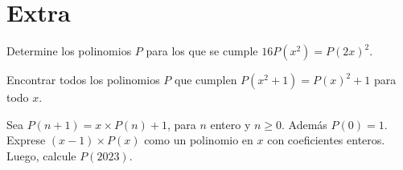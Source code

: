 \section{Extra}

\begin{section-problem}
    Determine los polinomios $P$ para los que se cumple $16P(x^2) = P(2x)^2.$
\end{section-problem}

\begin{section-problem}
    Encontrar todos los polinomios $P$ que cumplen $P(x^2+1) = P(x)^2+1$ para todo $x$.
\end{section-problem}

\begin{section-problem}
    Sea $P(n + 1) = x\times P(n) + 1$, para $n$ entero y $n \geq 0$. Además $P(0) = 1$. Exprese $(x-1)\times P(x)$ como un polinomio en $x$ con coeficientes enteros. Luego, calcule $P(2023)$.
\end{section-problem}